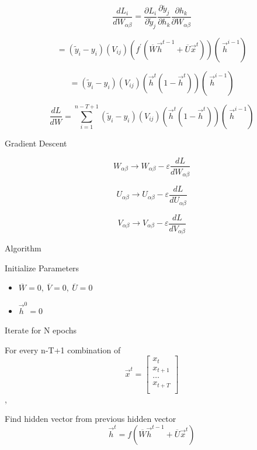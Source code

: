 \documentclass[
]{article}
\begin{document}
\[\frac{dL_{i}}{dW_{\alpha\beta}} = \frac{\partial L_{i}}{\partial{\widetilde{y}}_{j}}\frac{\partial{\widetilde{y}}_{j}}{\partial h_{k}}\frac{\partial h_{k}}{\partial W_{\alpha\beta}}\]

\[= \left( {\widetilde{y}}_{i} - y_{i} \right)\left( V_{ij} \right)\left( f^{'}\left( \overline{W}{\overrightarrow{h}}^{t - 1} + \overline{U}{\overrightarrow{x}}^{t} \right) \right)\left( \ {\overrightarrow{h}}^{i - 1} \right)\]

\[= \left( {\widetilde{y}}_{i} - y_{i} \right)\left( V_{ij} \right)\left( {\overrightarrow{h}}^{t}\left( 1 - {\overrightarrow{h}}^{t} \right) \right)\left( \ {\overrightarrow{h}}^{i - 1} \right)\]

\[\frac{dL}{dW} = \sum_{i = 1}^{n - T + 1}{\left( {\widetilde{y}}_{i} - y_{i} \right)\left( V_{ij} \right)\left( {\overrightarrow{h}}^{t}\left( 1 - {\overrightarrow{h}}^{t} \right) \right)\left( \ {\overrightarrow{h}}^{i - 1} \right)}\]

Gradient Descent

\[W_{\alpha\beta} \rightarrow W_{\alpha\beta} - \varepsilon\frac{dL}{dW_{\alpha\beta}}\]

\[U_{\alpha\beta} \rightarrow U_{\alpha\beta} - \varepsilon\frac{dL}{dU_{\alpha\beta}}\]

\[V_{\alpha\beta} \rightarrow V_{\alpha\beta} - \varepsilon\frac{dL}{dV_{\alpha\beta}}\]

Algorithm

Initialize Parameters

\begin{itemize}
\item
  \(\overline{W} = 0,\ \overline{V} = 0,\ \overline{U} = 0\)
\item
  \({\overrightarrow{h}}^{0} = 0\ \)
\end{itemize}

Iterate for N epochs

For every n-T+1 combination of
\[{\overrightarrow{x}}^{t} = \begin{bmatrix}
x_{t} \\
x_{t + 1} \\
\ldots \\
x_{t + T} \\
\end{bmatrix}\] ,

Find hidden vector from previous hidden vector\\
\[{\overrightarrow{h}}^{t} = f\left( \overline{W}{\overrightarrow{h}}^{t - 1} + \overline{U}{\overrightarrow{x}}^{t} \right)\]
\end{document}
